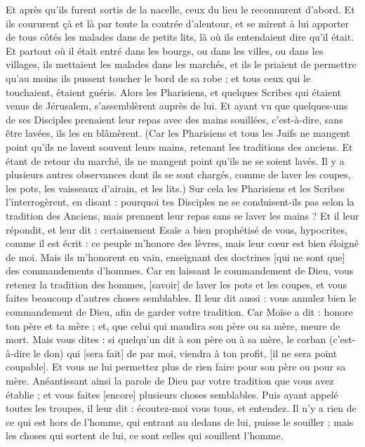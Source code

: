 \begin{multicols}{2}
Et après qu'ils furent sortis de la nacelle, ceux du lieu le reconnurent d'abord.
Et ils coururent çà et là par toute la contrée d'alentour, et se mirent à lui apporter de tous côtés les malades dans de petits lits, là où ils entendaient dire qu'il était.
Et partout où il était entré dans les bourgs, ou dans les villes, ou dans les villages, ils mettaient les malades dans les marchés, et ils le priaient de permettre qu'au moins ils pussent toucher le bord de sa robe ; et tous ceux qui le touchaient, étaient guéris.
\VerseOne{}Alors les Pharisiens, et quelques Scribes qui étaient venus de Jérusalem, s'assemblèrent auprès de lui.
Et ayant vu que quelques-uns de ses Disciples prenaient leur repas avec des mains souillées, c'est-à-dire, sans être lavées, ils les en blâmèrent.
(Car les Pharisiens et tous les Juifs ne mangent point qu'ils ne lavent souvent leurs mains, retenant les traditions des anciens.
Et étant de retour du marché, ils ne mangent point qu'ils ne se soient lavés. Il y a plusieurs autres observances dont ils se sont chargés, comme de laver les coupes, les pots, les vaisseaux d'airain, et les lits.)
Sur cela les Pharisiens et les Scribes l'interrogèrent, en disant : pourquoi tes Disciples ne se conduisent-ils pas selon la tradition des Anciens, mais prennent leur repas sans se laver les mains ?
Et il leur répondit, et leur dit : certainement Esaïe a bien prophétisé de vous, hypocrites, comme il est écrit : ce peuple m'honore des lèvres, mais leur cœur est bien éloigné de moi.
Mais ils m'honorent en vain, enseignant des doctrines [qui ne sont que] des commandements d'hommes.
Car en laissant le commandement de Dieu, vous retenez la tradition des hommes, [savoir] de laver les pots et les coupes, et vous faites beaucoup d'autres choses semblables.
Il leur dit aussi : vous annulez bien le commandement de Dieu, afin de garder votre tradition.
Car Moïse a dit : honore ton père et ta mère ; et, que celui qui maudira son père ou sa mère, meure de mort.
Mais vous dites : si quelqu'un dit à son père ou à sa mère, le corban (c’est-à-dire le don) qui [sera fait] de par moi, viendra à ton profit, [il ne sera point coupable].
Et vous ne lui permettez plus de rien faire pour son père ou pour sa mère.
Anéantissant ainsi la parole de Dieu par votre tradition que vous avez établie ; et vous faites [encore] plusieurs choses semblables.
Puis ayant appelé toutes les troupes, il leur dit : écoutez-moi vous tous, et entendez.
Il n'y a rien de ce qui est hors de l'homme, qui entrant au dedans de lui, puisse le souiller ; mais les choses qui sortent de lui, ce sont celles qui souillent l'homme.

\end{multicols}
